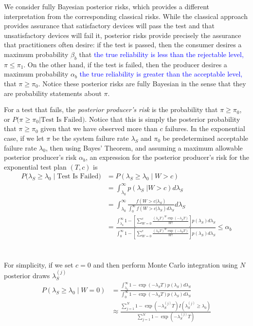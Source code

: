 \documentclass[12pt]{article}
\begin{document}
We consider fully Bayesian posterior risks, which provides a
different interpretation from the corresponding classical risks.  While the classical approach
provides assurance that satisfactory devices will pass the test and that
unsatisfactory devices will fail it, posterior risks provide precisely the
assurance that practitioners often desire: if the test is passed, then the
consumer desires a maximum probability $\beta_b$ that \textcolor{blue}{the true reliability is less than the rejectable level,} $\pi \leq \pi_1$. On the
other hand, if the test is failed, then the producer desires a maximum
probability $\alpha_b$ \textcolor{blue}{the true reliability is greater than the acceptable level,} that $\pi \geq \pi_0$. Notice these posterior risks are fully Bayesian in the sense that they are probability statements about $\pi$.

For a test that fails, the \emph{posterior producer's risk} is the probability
that $\pi \geq \pi_{0}$, or $P \text{(}\pi \ge \pi_0 \vert \text{Test Is
Failed)}$. Notice that this is simply the posterior probability that $\pi \ge
\pi_0$ given that we have observed more than $c$ failures. In the exponential
case, if we let $\pi$ be the system failure rate $\lambda_S$ and $\pi_0$ be
predetermined acceptable failure rate $\lambda_0$, then using Bayes' Theorem,
and assuming a maximum allowable posterior producer's risk $\alpha_b$, an
expression for the posterior producer's risk for the exponential test plan
$(T,c)$ is
$$
\begin{aligned}
    P(\lambda_S \geq \lambda_0 \; \vert \; \text{Test Is Failed)} &= P(\lambda_S
    \geq \lambda_0 \; \vert \; W > c) \\ &= \int_{\lambda_0}^{\infty}
    p(\lambda_S \; \vert W > c) d\lambda_S \\ &= \int_{\lambda_0}^{\infty}
    \frac{f(W > c \vert \lambda_S)}{\int_{0}^{\infty} f(W > c \vert \lambda_S)
    d\lambda_S} d\lambda_S \\ &= \frac{\int_{\lambda_0}^{\infty} 1 - [ \sum_{W=0}^c
    \frac{(\lambda_S T)^W \exp(-\lambda_S T)}{W!}]p(\lambda_S)d\lambda_S}
    {\int_{0}^{\infty} 1 - [ \sum_{W=0}^c \frac{(\lambda_S T)^W \exp(-\lambda_S
    T)}{W!}]p(\lambda_S)d\lambda_S} \leq \alpha_b
\end{aligned}
$$
\\
\\
For simplicity, if we set $c = 0$ and then perform Monte Carlo integration
using $N$ posterior draws $ \lambda_S^{(j)} $
$$
\begin{aligned}
	 P(\lambda_S \geq \lambda_0 \; \vert \; W = 0) &=
	 \frac{\int_{\lambda_0}^{\infty} 1 - \exp(-\lambda_S T)p(\lambda_S)d\lambda_S}
	 {\int_{0}^{\infty} 1 - \exp(-\lambda_S T)p(\lambda_S)d\lambda_S} \\ &\approx
	 \frac{\sum_{j = 1}^{N} 1 - \exp(-\lambda_S^{(j)} T)I(\lambda_S^{(j)} \geq
	 \lambda_0)} {\sum_{j = 1}^{N} 1 - \exp(-\lambda_S^{(j)} T)} \end{aligned}
$$
\end{document}
